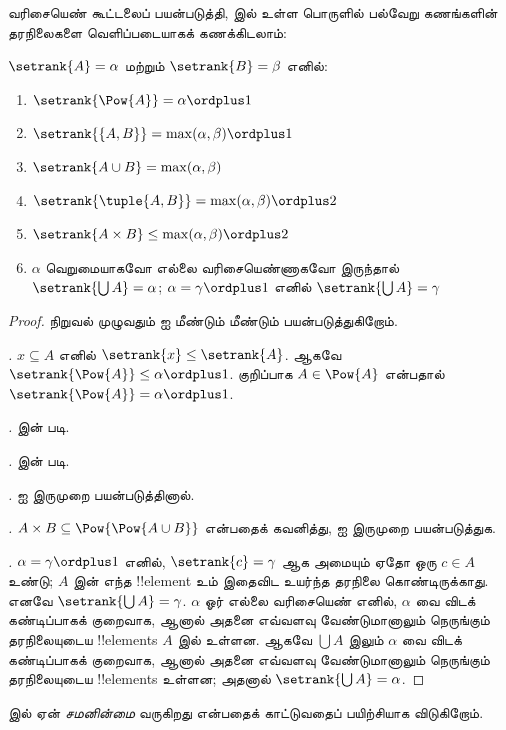 \documentclass[../../../include/open-logic-section]{subfiles}
\begin{document}

வரிசையெண் கூட்டலைப் பயன்படுத்தி, 
இல் உள்ள பொருளில் பல்வேறு கணங்களின் தரநிலைகளை வெளிப்படையாகக்
கணக்கிடலாம்:

\begin{lem}
$\setrank{A} = \alpha$ மற்றும் $\setrank{B} = \beta$ எனில்:
\begin{enumerate}
  \item{} $\setrank{\Pow{A}} = \alpha\ordplus 1$
  \item{} $\setrank{\{A, B\}} = \max(\alpha,
  \beta) \ordplus 1$
  \item{} $\setrank{A \cup B} = \max(\alpha,
  \beta)$
  \item{} $\setrank{\tuple{A,B}} = \max(\alpha,
  \beta) \ordplus  2$
  \item{} $\setrank{A \times B} \leq
  \max(\alpha, \beta) \ordplus  2$
  \item{} $\alpha$ வெறுமையாகவோ எல்லை
  வரிசையெண்ணாகவோ இருந்தால் $\setrank{\bigcup A} = \alpha$;
  $\alpha = \gamma\ordplus 1$ எனில் $\setrank{\bigcup A} = \gamma$
\end{enumerate}
\end{lem}

\begin{proof}
நிறுவல் முழுவதும்  ஐ மீண்டும்
மீண்டும் பயன்படுத்துகிறோம்.

\emph{.} $x \subseteq A$ எனில்
$\setrank{x} \leq \setrank{A}$. ஆகவே
$\setrank{\Pow{A}} \leq \alpha \ordplus  1$.
குறிப்பாக $A \in \Pow{A}$ என்பதால்
$\setrank{\Pow{A}} = \alpha \ordplus  1$.

\emph{.}  இன் படி.

\emph{.}  இன் படி.

\emph{.}  ஐ இருமுறை
பயன்படுத்தினால்.

\emph{.}
$A \times B \subseteq \Pow{\Pow{A \cup B}}$ என்பதைக் கவனித்து,
 ஐ இருமுறை பயன்படுத்துக.

\emph{.} $\alpha = \gamma\ordplus 1$ எனில்,
$\setrank{c} = \gamma$ ஆக அமையும் ஏதோ ஒரு $c \in A$ உண்டு;
$A$ இன் எந்த !!{element} உம் இதைவிட உயர்ந்த தரநிலை
கொண்டிருக்காது. எனவே $\setrank{\bigcup A} = \gamma$.
$\alpha$ ஓர் எல்லை வரிசையெண் எனில், $\alpha$ வை விடக்
கண்டிப்பாகக் குறைவாக, ஆனால் அதனை எவ்வளவு வேண்டுமானாலும்
நெருங்கும் தரநிலையுடைய !!{element}s $A$ இல் உள்ளன. ஆகவே
$\bigcup A$ இலும் $\alpha$ வை விடக் கண்டிப்பாகக் குறைவாக,
ஆனால் அதனை எவ்வளவு வேண்டுமானாலும் நெருங்கும் தரநிலையுடைய
!!{element}s உள்ளன; அதனால் $\setrank{\bigcup A} = \alpha$.
\end{proof}
\noindent
{} இல் ஏன் \emph{சமனின்மை} வருகிறது என்பதைக்
காட்டுவதைப் பயிற்சியாக விடுகிறோம்.
\end{document}
